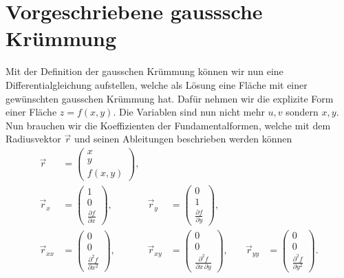 %
%
%
%
\section{Vorgeschriebene gausssche Krümmung
\label{mongeampere:section:teil2}}
Mit der Definition der gausschen Krümmung können wir nun eine Differentialgleichung aufstellen,
welche als Lösung eine Fläche mit einer gewünschten gausschen Krümmung hat.
Dafür nehmen wir die explizite Form einer Fläche $z = f(x,y)$.
Die Variablen sind nun nicht mehr $u, v$ sondern $x, y$.
Nun brauchen wir die Koeffizienten der Fundamentalformen, welche mit dem Radiusvektor $\vec r$ und seinen Ableitungen 
beschrieben werden können
\begin{equation*}
\begin{aligned}
  \vec r &= \begin{pmatrix}
   x \\
   y \\
   f(x, y)
 \end{pmatrix}, \\
    \vec r_x &= \begin{pmatrix}
      1 \\
      0 \\
      \frac{\partial f}{\partial x}
    \end{pmatrix},
      \quad &
    \vec r_y &= \begin{pmatrix}
      0 \\
      1 \\
      \frac{\partial f}{\partial y}
    \end{pmatrix},\\
      \vec r_{xx} &= \begin{pmatrix}
      0 \\
      0 \\
      \frac{\partial^2 f}{\partial x^2}
    \end{pmatrix},
    \quad &
    \vec r_{xy} &= \begin{pmatrix}
      0 \\
      0 \\
      \frac{\partial^2 f}{\partial x \, \partial y}
    \end{pmatrix},
      \quad &
    \vec r_{yy} &= \begin{pmatrix}
      0 \\
      0 \\
      \frac{\partial^2 f}{\partial y^2}
    \end{pmatrix}.
\end{aligned}
\end{equation*}
